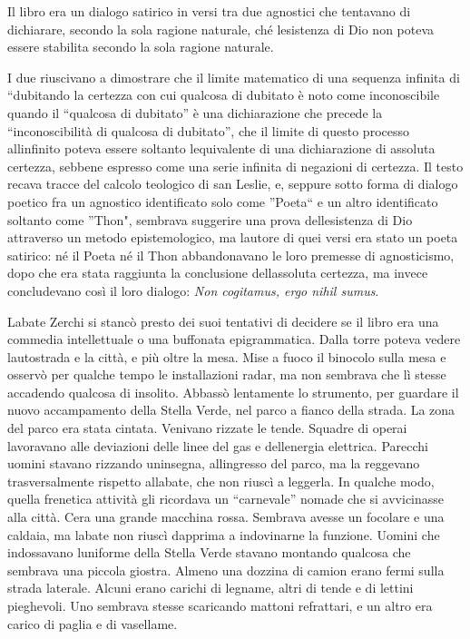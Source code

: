 Il libro era un dialogo satirico in versi tra due agnostici che
tentavano di dichiarare, secondo la sola ragione naturale, ché
l\textquotesingle esistenza di Dio non poteva essere stabilita secondo
la sola ragione naturale.

I due riuscivano a dimostrare che il limite matematico di una sequenza
infinita di ``dubitando la certezza con cui qualcosa di dubitato è noto
come inconoscibile quando il ``qualcosa di dubitato'' è una
dichiarazione che precede la ``inconoscibilità\textquotesingle{} di
qualcosa di dubitato'', che il limite di questo processo
all\textquotesingle infinito poteva essere soltanto
l\textquotesingle equivalente di una dichiarazione di assoluta certezza,
sebbene espresso come una serie infinita di negazioni di certezza. Il
testo recava tracce del calcolo teologico di san Leslie, e, seppure
sotto forma di dialogo poetico fra un agnostico identificato solo come
''Poeta`` e un altro identificato soltanto come ''Thon", sembrava
suggerire una prova dell\textquotesingle esistenza di Dio attraverso un
metodo epistemologico, ma l\textquotesingle autore di quei versi era
stato un poeta satirico: né il Poeta né il Thon abbandonavano le loro
premesse di agnosticismo, dopo che era stata raggiunta la conclusione
dell\textquotesingle assoluta certezza, ma invece concludevano così il
loro dialogo: \emph{Non cogitamus, ergo nihil sumus}.

L\textquotesingle abate Zerchi si stancò presto dei suoi tentativi di
decidere se il libro era una commedia intellettuale o una buffonata
epigrammatica. Dalla torre poteva vedere l\textquotesingle autostrada e
la città, e più oltre la mesa. Mise a fuoco il binocolo sulla mesa e
osservò per qualche tempo le installazioni radar, ma non sembrava che lì
stesse accadendo qualcosa di insolito. Abbassò lentamente lo strumento,
per guardare il nuovo accampamento della Stella Verde, nel parco a
fianco della strada. La zona del parco era stata cintata. Venivano
rizzate le tende. Squadre di operai lavoravano alle deviazioni delle
linee del gas e dell\textquotesingle energia elettrica. Parecchi uomini
stavano rizzando un\textquotesingle insegna,
all\textquotesingle ingresso del parco, ma la reggevano trasversalmente
rispetto all\textquotesingle abate, che non riuscì a leggerla. In
qualche modo, quella frenetica attività gli ricordava un ``carnevale''
nomade che si avvicinasse alla città. C\textquotesingle era una grande
macchina rossa. Sembrava avesse un focolare e una caldaia, ma
l\textquotesingle abate non riuscì dapprima a indovinarne la funzione.
Uomini che indossavano l\textquotesingle uniforme della Stella Verde
stavano montando qualcosa che sembrava una piccola giostra. Almeno una
dozzina di camion erano fermi sulla strada laterale. Alcuni erano
carichi di legname, altri di tende e di lettini pieghevoli. Uno sembrava
stesse scaricando mattoni refrattari, e un altro era carico di paglia e
di vasellame.

